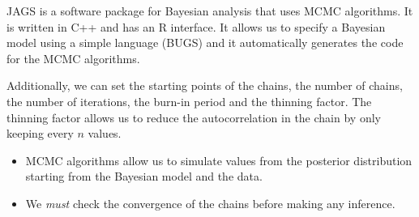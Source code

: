 JAGS is a software package for Bayesian analysis that uses MCMC algorithms.
It is written in C++ and has an R interface.
It allows us to specify a Bayesian model using a simple language (BUGS) and
it automatically generates the code for the MCMC algorithms.

Additionally, we can set the starting points of the chains, the number of chains,
the number of iterations, the burn-in period and the thinning factor.
The thinning factor allows us to reduce the autocorrelation in the chain
by only keeping every $n$ values.

\begin{recap}{}{}
	\begin{itemize}
		\item MCMC algorithms allow us to simulate values from the posterior distribution
		      starting from the Bayesian model and the data.
		\item We \emph{must} check the convergence of the chains before making any inference.
	\end{itemize}
\end{recap}



